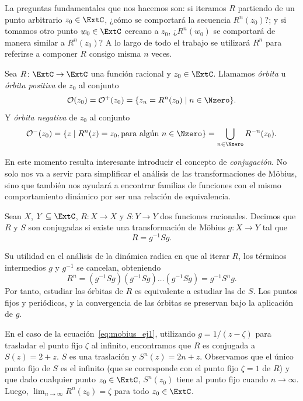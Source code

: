 La preguntas fundamentales que nos hacemos son: si iteramos $R$ partiendo de un
punto arbitrario $z_0 \in \ExtC$, ¿cómo se comportará la secuencia $R^n(z_0)$?;
y si tomamos otro punto $w_0 \in \ExtC$ cercano a $z_0$, ¿$R^n(w_0)$ se
comportará de manera similar a $R^n(z_0)$? A lo largo de todo el trabajo se
utilizará $R^n$ para referirse a componer $R$ consigo misma $n$ veces.

\begin{definicion}[Órbita]
    Sea $R \colon \ExtC \to \ExtC$ una función racional y $z_0 \in \ExtC$.
    Llamamos \emph{órbita} u \emph{órbita positiva} de $z_0$ al conjunto
    \[
        \mathcal{O}(z_0) = \mathcal{O}^+(z_0) = \{z_n = R^n(z_0) \mid n \in \Nzero\}.
    \]
    Y \emph{órbita negativa} de $z_0$ al conjunto
    \[
        \mathcal{O}^-(z_0) = \{z \mid R^n(z) = z_0, \text{para algún $n \in \Nzero$}\} = \bigcup_{n \in \Nzero}R^{-n}(z_0).
    \]
\end{definicion}

En este momento resulta interesante introducir el concepto de
\emph{conjugación}. No solo nos va a servir para simplificar el análisis de las
transformaciones de Möbius, sino que también nos ayudará a encontrar familias de
funciones con el mismo comportamiento dinámico por ser una relación de
equivalencia.

\begin{definicion}[Conjugación]
    Sean $X$, $Y \subseteq \ExtC$, $R \colon X \to X$ y $S \colon Y \to Y$ dos
    funciones racionales. Decimos que $R$ y $S$ son conjugadas si existe una
    transformación de Möbius $g \colon X \to Y$ tal que
    \[
        R = g^{-1} S g.
    \]
\end{definicion}

Su utilidad en el análisis de la dinámica radica en que al iterar $R$, los
términos intermedios $g$ y $g^{-1}$ se cancelan, obteniendo
\[
    R^n = (g^{-1} S g) (g^{-1} S g) \dots (g^{-1} S g) = g^{-1} S^n g.
\]
Por tanto, estudiar las órbitas de $R$ es equivalente a estudiar las de $S$. Los
puntos fijos y periódicos, y la convergencia de las órbitas se preservan bajo la
aplicación de $g$.

En el caso de la ecuación~\ref{eq:mobius_ej1}, utilizando $g = 1/(z-\zeta)$ para
trasladar el punto fijo $\zeta$ al infinito, encontramos que $R$ es conjugada a
$S(z) = 2 + z$. $S$ es una traslación y $S^n(z) = 2n + z$. Observamos que el
único punto fijo de $S$ es el infinito (que se corresponde con el punto fijo
$\zeta = 1$ de $R$) y que dado cualquier punto $z_0 \in \ExtC$, $S^n(z_0)$ tiene
al punto fijo cuando $n \to \infty$. Luego, $\lim_{n \to \infty} R^n(z_0) =
\zeta$ para todo $z_0 \in \ExtC$.

